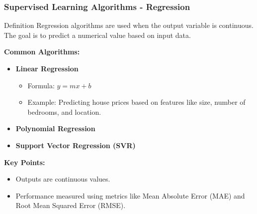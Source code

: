 \documentclass{beamer}
\begin{document}
\begin{frame}[fragile]
    \frametitle{Supervised Learning Algorithms - Regression}
    \begin{block}{Definition}
        Regression algorithms are used when the output variable is continuous. The goal is to predict a numerical value based on input data.
    \end{block}
    
    \textbf{Common Algorithms:}
    \begin{itemize}
        \item \textbf{Linear Regression}
            \begin{itemize}
                \item Formula: \( y = mx + b \)
                \item Example: Predicting house prices based on features like size, number of bedrooms, and location.
            \end{itemize}
        \item \textbf{Polynomial Regression}
        \item \textbf{Support Vector Regression (SVR)}
    \end{itemize}
    
    \textbf{Key Points:}
    \begin{itemize}
        \item Outputs are continuous values.
        \item Performance measured using metrics like Mean Absolute Error (MAE) and Root Mean Squared Error (RMSE).
    \end{itemize}
\end{frame}
\end{document}
